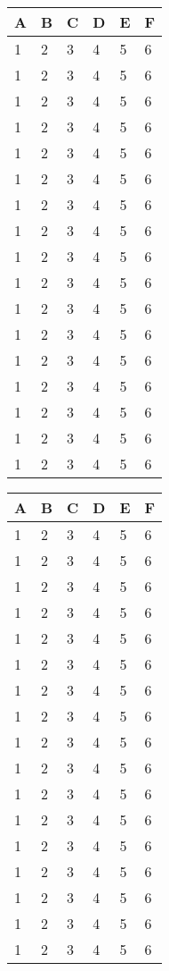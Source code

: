 \newcommand{\ftable}[1]{\begin{sidewaystable}
\begin{tabular}[H]{ m{2cm} m{3cm} m{6cm} m{2.5cm} m{2cm} m{2cm} }
    \toprule
    A & B & C & D & E & F \\
    \midrule
    #1
    \bottomrule
\end{tabular}
\end{sidewaystable}
}

\newcommand{\fentry}[6]{#1 & #2 & #3 & #4 & #5 & #6\\}

\ftable{
    \fentry{1}{2}{3}{4}{5}{6}
    \fentry{1}{2}{3}{4}{5}{6}
    \fentry{1}{2}{3}{4}{5}{6}
    \fentry{1}{2}{3}{4}{5}{6}
    \fentry{1}{2}{3}{4}{5}{6}
    \fentry{1}{2}{3}{4}{5}{6}
    \fentry{1}{2}{3}{4}{5}{6}
    \fentry{1}{2}{3}{4}{5}{6}
    \fentry{1}{2}{3}{4}{5}{6}
    \fentry{1}{2}{3}{4}{5}{6}
    \fentry{1}{2}{3}{4}{5}{6}
    \fentry{1}{2}{3}{4}{5}{6}
    \fentry{1}{2}{3}{4}{5}{6}
    \fentry{1}{2}{3}{4}{5}{6}
    \fentry{1}{2}{3}{4}{5}{6}
    \fentry{1}{2}{3}{4}{5}{6}
    \fentry{1}{2}{3}{4}{5}{6}
}

\ftable{
    \fentry{1}{2}{3}{4}{5}{6}
    \fentry{1}{2}{3}{4}{5}{6}
    \fentry{1}{2}{3}{4}{5}{6}
    \fentry{1}{2}{3}{4}{5}{6}
    \fentry{1}{2}{3}{4}{5}{6}
    \fentry{1}{2}{3}{4}{5}{6}
    \fentry{1}{2}{3}{4}{5}{6}
    \fentry{1}{2}{3}{4}{5}{6}
    \fentry{1}{2}{3}{4}{5}{6}
    \fentry{1}{2}{3}{4}{5}{6}
    \fentry{1}{2}{3}{4}{5}{6}
    \fentry{1}{2}{3}{4}{5}{6}
    \fentry{1}{2}{3}{4}{5}{6}
    \fentry{1}{2}{3}{4}{5}{6}
    \fentry{1}{2}{3}{4}{5}{6}
    \fentry{1}{2}{3}{4}{5}{6}
    \fentry{1}{2}{3}{4}{5}{6}
}